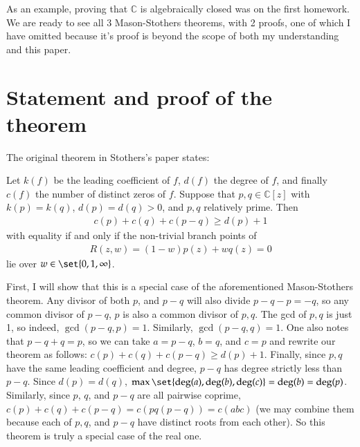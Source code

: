 \documentclass[12pt]{article}
\newenvironment{theorem}{\begin{mytheorem}}{\end{mytheorem}}
\theoremstyle{definitionstyle}
\def\mbb#1{\mathbb{#1}}
\def \C{\mbb{C}}
\begin{document}
As an example, proving that $\C$ is algebraically closed was on the first homework. We are ready to see all 3 Mason-Stothers theorems, with 2 proofs, one of which I have omitted because it's proof is beyond the scope of both my understanding and this paper. 

\section{Statement and proof of the theorem}
The original theorem in Stothers's paper states:
\begin{theorem}[Stothers]
	Let $k(f)$ be the leading coefficient of $f$, $d(f)$ the degree of $f$, and finally $c(f)$ the number of distinct zeros of $f$.
	Suppose that $p, q \in \C[z]$ with $k(p) = k(q)$, $d(p)=d(q) > 0$, and $p, q$ relatively prime. Then
	\begin{align}
		c(p)+c(q)+c(p-q) \geq d(p) + 1
	\end{align}
	with equality if and only if the non-trivial branch points of 
	\begin{align}
		R(z, w) = (1-w)p(z) + wq(z) = 0
	\end{align}
	lie over $w \in \set{0, 1, \infty}$.
\end{theorem}
First, I will show that this is a special case of the aforementioned Mason-Stothers theorem. Any divisor of both $p$, and $p-q$ will also divide $p-q - p = -q$, so any common divisor of $p-q$, $p$ is also a common divisor of $p, q$. The gcd of $p,q$ is just 1, so indeed, $\gcd(p-q, p) = 1$. Similarly, $\gcd(p-q, q) = 1$. One also notes that $p - q + q = p$, so we can take $a = p-q$, $b = q$, and $c=p$ and rewrite our theorem as follows: $c(p)+c(q)+c(p-q) \geq d(p) + 1$. Finally, since $p, q$ have the same leading coefficient and degree, $p-q$ has degree strictly less than $p-q$. Since $d(p)=d(q)$, $\max\set{\deg(a),\deg(b),\deg(c)}=\deg(b)=\deg(p)$. Similarly, since $p$, $q$, and $p-q$ are all pairwise coprime, $c(p)+c(q)+c(p-q) = c(pq(p-q)) = c(abc)$ (we may combine them because each of $p, q$, and $p-q$ have distinct roots from each other). So this theorem is truly a special case of the real one.
\end{document}
